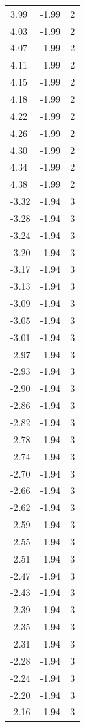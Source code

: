 \begin{longtable}{lrr}
  3.99 & -1.99 & 2 \\
  4.03 & -1.99 & 2 \\
  4.07 & -1.99 & 2 \\
  4.11 & -1.99 & 2 \\
  4.15 & -1.99 & 2 \\
  4.18 & -1.99 & 2 \\
  4.22 & -1.99 & 2 \\
  4.26 & -1.99 & 2 \\
  4.30 & -1.99 & 2 \\
  4.34 & -1.99 & 2 \\
  4.38 & -1.99 & 2 \\
  -3.32 & -1.94 & 3 \\
  -3.28 & -1.94 & 3 \\
  -3.24 & -1.94 & 3 \\
  -3.20 & -1.94 & 3 \\
  -3.17 & -1.94 & 3 \\
  -3.13 & -1.94 & 3 \\
  -3.09 & -1.94 & 3 \\
  -3.05 & -1.94 & 3 \\
  -3.01 & -1.94 & 3 \\
  -2.97 & -1.94 & 3 \\
  -2.93 & -1.94 & 3 \\
  -2.90 & -1.94 & 3 \\
  -2.86 & -1.94 & 3 \\
  -2.82 & -1.94 & 3 \\
  -2.78 & -1.94 & 3 \\
  -2.74 & -1.94 & 3 \\
  -2.70 & -1.94 & 3 \\
  -2.66 & -1.94 & 3 \\
  -2.62 & -1.94 & 3 \\
  -2.59 & -1.94 & 3 \\
  -2.55 & -1.94 & 3 \\
  -2.51 & -1.94 & 3 \\
  -2.47 & -1.94 & 3 \\
  -2.43 & -1.94 & 3 \\
  -2.39 & -1.94 & 3 \\
  -2.35 & -1.94 & 3 \\
  -2.31 & -1.94 & 3 \\
  -2.28 & -1.94 & 3 \\
  -2.24 & -1.94 & 3 \\
  -2.20 & -1.94 & 3 \\
  -2.16 & -1.94 & 3 \\

\end{longtable}
